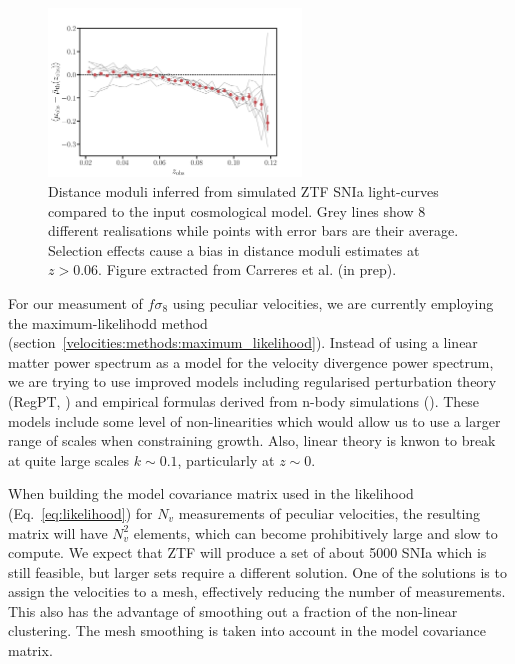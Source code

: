 \begin{figure}
    \centering
    \includegraphics[width=0.6\textwidth]{fig/velocities/bastien_hd_residuals.pdf}
    \caption{Distance moduli inferred from simulated ZTF SNIa light-curves compared to the input cosmological model. 
    Grey lines show 8 different realisations while points with error bars are their average. 
    Selection effects cause a bias in distance moduli estimates at $z>0.06$. 
    Figure extracted from Carreres et al. (in prep).}
    \label{fig:ztf_snsim_hubble_diagram}
\end{figure}

For our measument of $f\sigma_8$ using peculiar velocities, we are currently employing 
the maximum-likelihodd method (section~\ref{velocities:methods:maximum_likelihood}). 
Instead of using a linear matter power spectrum as a model for the velocity divergence 
power spectrum, we are trying to use improved models including regularised perturbation 
theory (RegPT, \cite{taruyaDirectFastCalculation2012}) and empirical formulas derived
from n-body simulations (\cite{belAccurateFittingFunctions2019}). 
These models include some level of non-linearities which would allow us to use 
a larger range of scales when constraining growth. Also, linear theory is knwon to break 
at quite large scales $k\sim 0.1$, particularly at $z\sim0$. 

When building the model covariance matrix used in the likelihood (Eq.~\ref{eq:likelihood})
for $N_v$ measurements of peculiar velocities, the resulting matrix will have $N_v^2$ elements, 
which can become prohibitively large and slow to compute. We expect that ZTF will produce a set 
of about 5000 SNIa which is still feasible, but larger sets require a different solution. 
One of the solutions is to assign the velocities to a mesh, effectively reducing the number of 
measurements. This also has the advantage of smoothing out a fraction of the non-linear clustering. 
The mesh smoothing is taken into account in the model covariance matrix. 

